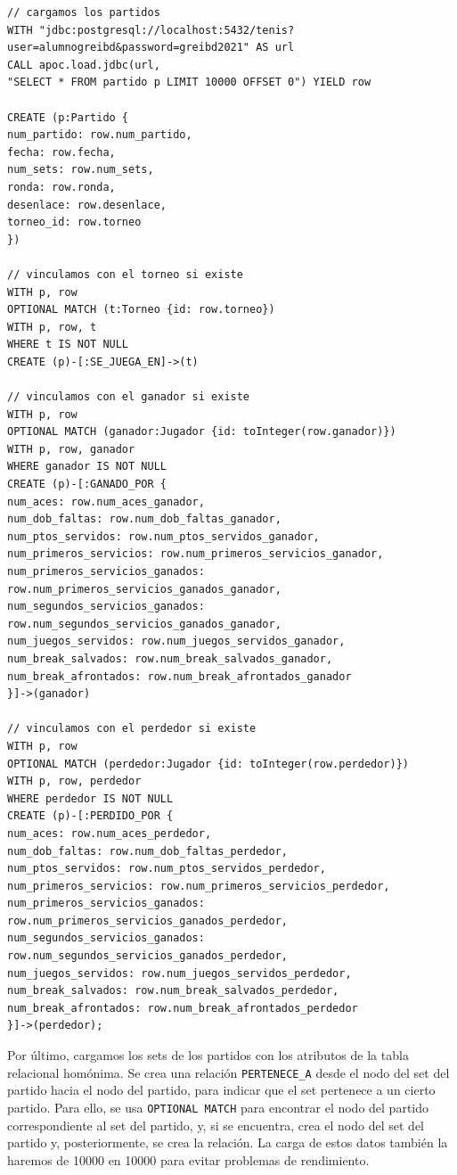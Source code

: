 \begin{verbatim}
// cargamos los partidos
WITH "jdbc:postgresql://localhost:5432/tenis?user=alumnogreibd&password=greibd2021" AS url
CALL apoc.load.jdbc(url,
"SELECT * FROM partido p LIMIT 10000 OFFSET 0") YIELD row

CREATE (p:Partido {
num_partido: row.num_partido,
fecha: row.fecha,
num_sets: row.num_sets,
ronda: row.ronda,
desenlace: row.desenlace,
torneo_id: row.torneo 
})

// vinculamos con el torneo si existe
WITH p, row
OPTIONAL MATCH (t:Torneo {id: row.torneo})
WITH p, row, t
WHERE t IS NOT NULL
CREATE (p)-[:SE_JUEGA_EN]->(t)

// vinculamos con el ganador si existe
WITH p, row
OPTIONAL MATCH (ganador:Jugador {id: toInteger(row.ganador)})
WITH p, row, ganador
WHERE ganador IS NOT NULL
CREATE (p)-[:GANADO_POR {
num_aces: row.num_aces_ganador,
num_dob_faltas: row.num_dob_faltas_ganador,
num_ptos_servidos: row.num_ptos_servidos_ganador,
num_primeros_servicios: row.num_primeros_servicios_ganador,
num_primeros_servicios_ganados: row.num_primeros_servicios_ganados_ganador,
num_segundos_servicios_ganados: row.num_segundos_servicios_ganados_ganador,
num_juegos_servidos: row.num_juegos_servidos_ganador,
num_break_salvados: row.num_break_salvados_ganador,
num_break_afrontados: row.num_break_afrontados_ganador
}]->(ganador)

// vinculamos con el perdedor si existe
WITH p, row
OPTIONAL MATCH (perdedor:Jugador {id: toInteger(row.perdedor)})
WITH p, row, perdedor
WHERE perdedor IS NOT NULL
CREATE (p)-[:PERDIDO_POR {
num_aces: row.num_aces_perdedor,
num_dob_faltas: row.num_dob_faltas_perdedor,
num_ptos_servidos: row.num_ptos_servidos_perdedor,
num_primeros_servicios: row.num_primeros_servicios_perdedor,
num_primeros_servicios_ganados: row.num_primeros_servicios_ganados_perdedor,
num_segundos_servicios_ganados: row.num_segundos_servicios_ganados_perdedor,
num_juegos_servidos: row.num_juegos_servidos_perdedor,
num_break_salvados: row.num_break_salvados_perdedor,
num_break_afrontados: row.num_break_afrontados_perdedor
}]->(perdedor);
\end{verbatim}

Por último, cargamos los sets de los partidos con los atributos de la tabla relacional homónima. Se crea una relación \texttt{PERTENECE\_A} desde el nodo del set del partido hacia el nodo del partido, para indicar que el set pertenece a un cierto partido. Para ello, se usa \texttt{OPTIONAL MATCH} para encontrar el nodo del partido correspondiente al set del partido, y, si se encuentra, crea el nodo del set del partido y, posteriormente, se crea la relación. La carga de estos datos también la haremos de 10000 en 10000 para evitar problemas de rendimiento.

